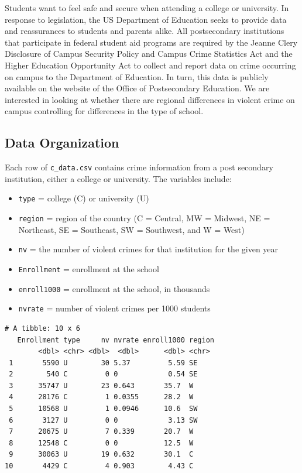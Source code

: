 \documentclass[
]{krantz}
\providecommand{\tightlist}{%
  \setlength{\itemsep}{0pt}\setlength{\parskip}{0pt}}
\begin{document}
Students want to feel safe and secure when attending a college or university. In response to legislation, the US Department of Education seeks to provide data and reassurances to students and parents alike. All postsecondary institutions that participate in federal student aid programs are required by the Jeanne Clery Disclosure of Campus Security Policy and Campus Crime Statistics Act and the Higher Education Opportunity Act to collect and report data on crime occurring on campus to the Department of Education. In turn, this data is publicly available on the website of the Office of Postsecondary Education. We are interested in looking at whether there are regional differences in violent crime on campus controlling for differences in the type of school.

\hypertarget{data-organization-1}{%
\subsection{Data Organization}\label{data-organization-1}}

Each row of \texttt{c\_data.csv} contains crime information from a post secondary institution, either a college or university. The variables include:

\begin{itemize}
\tightlist
\item
  \texttt{type} = college (C) or university (U)
\item
  \texttt{region} = region of the country (C = Central, MW = Midwest, NE = Northeast, SE = Southeast, SW = Southwest, and W = West)
\item
  \texttt{nv} = the number of violent crimes for that institution for the given year
\item
  \texttt{Enrollment} = enrollment at the school
\item
  \texttt{enroll1000} = enrollment at the school, in thousands
\item
  \texttt{nvrate} = number of violent crimes per 1000 students
\end{itemize}

\begin{verbatim}
# A tibble: 10 x 6
   Enrollment type     nv nvrate enroll1000 region
        <dbl> <chr> <dbl>  <dbl>      <dbl> <chr> 
 1       5590 U        30 5.37         5.59 SE    
 2        540 C         0 0            0.54 SE    
 3      35747 U        23 0.643       35.7  W     
 4      28176 C         1 0.0355      28.2  W     
 5      10568 U         1 0.0946      10.6  SW    
 6       3127 U         0 0            3.13 SW    
 7      20675 U         7 0.339       20.7  W     
 8      12548 C         0 0           12.5  W     
 9      30063 U        19 0.632       30.1  C     
10       4429 C         4 0.903        4.43 C     
\end{verbatim}
\end{document}
